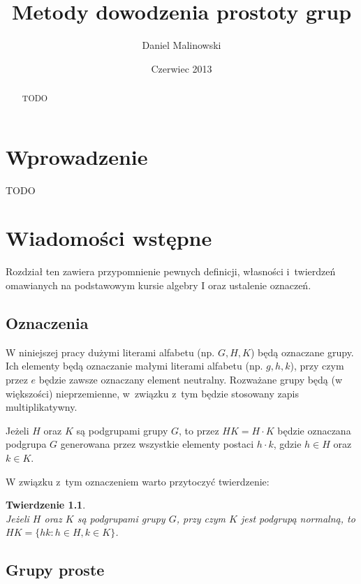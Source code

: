 \documentclass[licencjacka]{pracamgr}
\author{Daniel Malinowski}
\title{Metody dowodzenia prostoty grup}
\date{Czerwiec 2013}
\newtheorem{thh}{Twierdzenie}[section]
\begin{document}
\maketitle

\begin{abstract}
	TODO 
\end{abstract}

\tableofcontents


\chapter*{Wprowadzenie}

TODO

\chapter{Wiadomości wstępne}

Rozdział ten zawiera przypomnienie pewnych definicji, własności i~twierdzeń omawianych na podstawowym kursie algebry I
oraz ustalenie oznaczeń.

\section{Oznaczenia}

W niniejszej pracy dużymi literami alfabetu (np. $G, H, K$) będą oznaczane grupy.
Ich elementy będą oznaczanie małymi literami alfabetu (np. $g, h, k$), przy czym przez $e$ będzie zawsze oznaczany element neutralny.
Rozważane grupy będą (w większości) nieprzemienne, w~związku z~tym będzie stosowany zapis multiplikatywny.

Jeżeli $H$ oraz $K$ są podgrupami grupy $G$, to przez $H K = H \cdot K$ będzie oznaczana podgrupa $G$ 
generowana przez wszystkie elementy postaci $h \cdot k$, gdzie $h \in H$ oraz $k \in K$.

W związku z~tym oznaczeniem warto przytoczyć twierdzenie:

\begin{thh} \label{mult_groups} $ $ \\
	Jeżeli $H$ oraz $K$ są podgrupami grupy $G$, przy czym $K$ jest podgrupą normalną,
	to $HK = \{ h k \colon h \in H, k \in K\}$.
\end{thh}


\section{Grupy proste}
\end{document}
